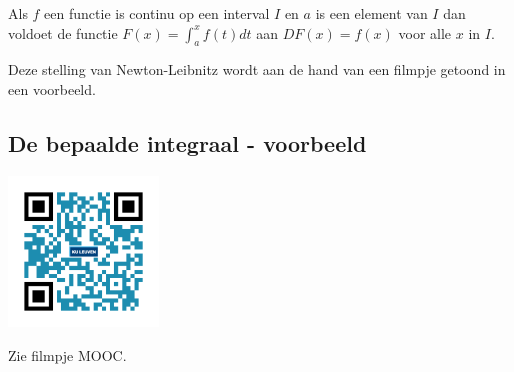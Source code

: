 \begin{eigenschap}
	Als $f$ een functie is continu op een interval $I$ en $a$ is een element van $I$ dan voldoet de functie $F(x) = \int^x_a f(t)dt$ aan $DF(x)=f(x)$ voor alle $x$ in $I$.
\end{eigenschap}

Deze stelling van Newton-Leibnitz wordt aan de hand van een filmpje getoond in een voorbeeld.

%
%
%
%
%
%


\subsection{De bepaalde integraal - voorbeeld}
\begin{minipage}{.25\linewidth}
	\raggedright
	\includegraphics[width=4cm]{6_afgeleiden_integralen/inputs/QR_Code_BEPINTVB_module6_2}
\end{minipage}
\begin{minipage}{.7\linewidth}
	Zie filmpje MOOC.
\end{minipage}


